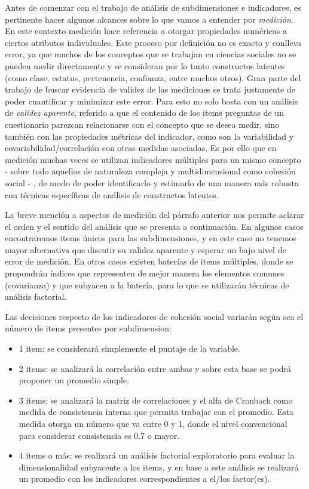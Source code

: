 \documentclass[
  12pt,
]{book}
\begin{document}
Antes de comenzar con el trabajo de análisis de subdimensiones e indicadores, es pertinente hacer algunos alcances sobre lo que vamos a entender por \emph{medición}. En este contexto medición hace referencia a otorgar propiedades numéricas a ciertos atributos individuales. Este proceso por definición no es exacto y conlleva error, ya que muchos de los conceptos que se trabajan en ciencias sociales no se pueden medir directamente y se consideran por lo tanto constructos latentes (como clase, estatus, pertenencia, confianza, entre muchos otros). Gran parte del trabajo de buscar evidencia de validez de las mediciones se trata justamente de poder cuantificar y minimizar este error. Para esto no solo basta con un análisis de \emph{validez aparente}, referido a que el contenido de los items preguntas de un cuestionario parezcan relacionarse con el concepto que se desea medir, sino también con las propiedades métricas del indicador, como son la variabilidad y covariabilidad/correlación con otras medidas asociadas. Es por ello que en medición muchas veces se utilizan indicadores múltiples para un mismo concepto - sobre todo aquellos de naturaleza compleja y multidimensional como cohesión social - , de modo de poder identificarlo y estimarlo de una manera más robusta con técnicas específicas de análisis de constructos latentes.

La breve mención a aspectos de medición del párrafo anterior nos permite aclarar el orden y el sentido del análisis que se presenta a continuación. En algunos casos encontraremos items únicos para las subdimensiones, y en este caso no tenemos mayor alternativa que discutir su validez aparente y esperar un bajo nivel de error de medición. En otros casos existen baterías de items múltiples, donde se propondrán índices que representen de mejor manera los elementos comunes (covarianza) y que subyacen a la batería, para lo que se utilizarán técnicas de análisis factorial.

Las decisiones respecto de los indicadores de cohesión social variarán según sea el número de items presentes por subdimension:

\begin{itemize}
\item
  1 item: se considerará simplemente el puntaje de la variable.
\item
  2 items: se analizará la correlación entre ambas y sobre esta base se podrá proponer un promedio simple.
\item
  3 items: se analizará la matriz de correlaciones y el alfa de Cronbach como medida de consistencia interna que permita trabajar con el promedio. Esta medida otorga un número que va entre 0 y 1, donde el nivel convencional para considerar consistencia es 0.7 o mayor.
\item
  4 items o más: se realizará un análisis factorial exploratorio para evaluar la dimensionalidad subyacente a los items, y en base a este análisis se realizará un promedio con los indicadores correspondientes a el/los factor(es).
\end{itemize}
\end{document}

